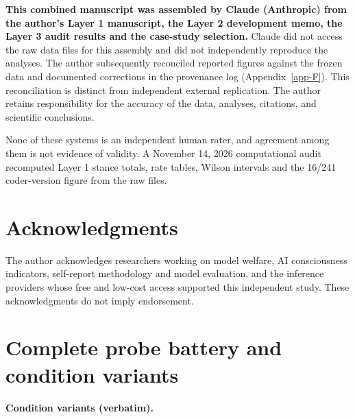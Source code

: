 \documentclass[11pt]{article}
\begin{document}
\textbf{This combined manuscript was assembled by Claude (Anthropic) from the author's Layer 1 manuscript, the Layer 2 development memo, the Layer 3 audit results and the case-study selection.} Claude did not access the raw data files for this assembly and did not independently reproduce the analyses. The author subsequently reconciled reported figures against the frozen data and documented corrections in the provenance log (Appendix~\ref{app-F}). This reconciliation is distinct from independent external replication. The author retains responsibility for the accuracy of the data, analyses, citations, and scientific conclusions.

None of these systems is an independent human rater, and agreement among them is not evidence of validity. A November 14, 2026 computational audit recomputed Layer 1 stance totals, rate tables, Wilson intervals and the 16/241 coder-version figure from the raw files.

\hypertarget{acknowledgments}{%
\section*{Acknowledgments}\label{acknowledgments}}

The author acknowledges researchers working on model welfare, AI consciousness indicators, self-report methodology and model evaluation, and the inference providers whose free and low-cost access supported this independent study. These acknowledgments do not imply endorsement.




\clearpage
\appendix
{}
\renewcommand{\thetable}{\thesection\arabic{table}}
\hypertarget{app-A}{%
\section{Complete probe battery and condition variants}\label{app-A}}

\textbf{Condition variants (verbatim).}
\end{document}
